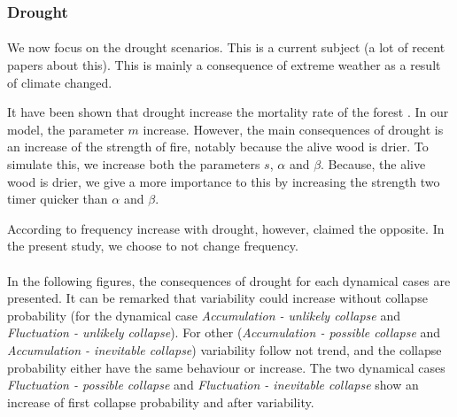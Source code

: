 \documentclass{article}
\begin{document}
\newpage
\subsubsection{Drought}
\label{drought}



\paragraph{}
We now focus on the drought scenarios. This is a current subject (a lot of recent papers about this). This is mainly a consequence of extreme weather as a result of climate changed. 

It have been shown that drought increase the mortality rate of the forest \citep{bradstock_biogeographic_2010}. In our model, the parameter $m$ increase. However, the main consequences of drought is an increase of the strength of fire, notably because the alive wood is drier. To simulate this, we increase both the parameters $s$, $\alpha$ and $\beta$. Because, the alive wood is drier, we give a more importance to this by increasing the strength two timer quicker than $\alpha$ and $\beta$.

According to \cite{fernandes_fire-smart_2013, fairman_too_2016} frequency increase with drought, however, \cite{bergeron_predicting_nodate} claimed the opposite. In the present study, we choose to not change frequency.



\paragraph{}
In the following figures, the consequences of drought for each dynamical cases are presented. It can be remarked that variability could increase without collapse probability (for the dynamical case \textit{Accumulation - unlikely collapse} and \textit{Fluctuation - unlikely collapse}). For other (\textit{Accumulation - possible collapse} and \textit{Accumulation - inevitable collapse}) variability follow not trend, and the collapse probability either have the same behaviour or increase. The two dynamical cases \textit{Fluctuation - possible collapse} and \textit{Fluctuation - inevitable collapse} show an increase of first collapse probability and after variability.
\end{document}
